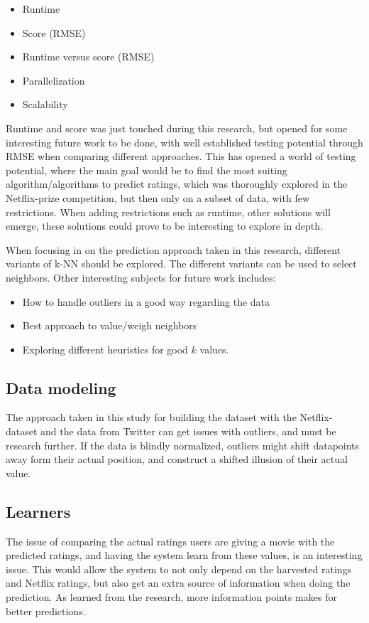 \begin{itemize}
    \item Runtime
    \item Score (RMSE)
    \item Runtime versus score (RMSE)
    \item Parallelization
    \item Scalability
\end{itemize}

Runtime and score was just touched during this research, but opened for some interesting future work to be done, with well established testing potential through RMSE when comparing different approaches. This has opened a world of testing potential, where the main goal would be to find the most suiting algorithm/algorithms to predict ratings, which was thoroughly explored in the Netflix-prize competition, but then only on a subset of data, with few restrictions. When adding restrictions such as runtime, other solutions will emerge, these solutions could prove to be interesting to explore in depth.

When focusing in on the prediction approach taken in this research, different variants of k-NN should be explored. The different variants can be used to select neighbors. Other interesting subjects for future work includes:

\begin{itemize}
    \item How to handle outliers in a good way regarding the data
    \item Best approach to value/weigh neighbors
    \item Exploring different heuristics for good $k$ values.
\end{itemize}



\subsection{Data modeling}
The approach taken in this study for building the dataset with the Netflix-dataset and the data from Twitter can get issues with outliers, and must be research further. If the data is blindly normalized, outliers might shift datapoints away form their actual position, and construct a shifted illusion of their actual value.


\subsection{Learners}
The issue of comparing the actual ratings users are giving a movie with the predicted ratings, and having the system learn from these values, is an interesting issue. This would allow the system to not only depend on the harvested ratings and Netflix ratings, but also get an extra source of information when doing the prediction. As learned from the research, more information points makes for better predictions.

